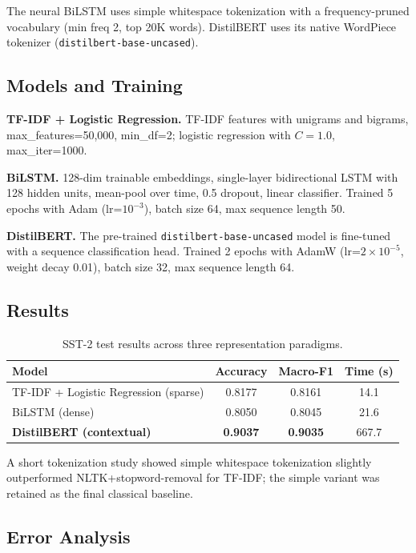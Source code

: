 \documentclass[11pt,a4paper]{article}
\begin{document}
The neural BiLSTM uses simple whitespace tokenization with a frequency-pruned vocabulary (min freq 2, top 20K words). DistilBERT uses its native WordPiece tokenizer (\texttt{distilbert-base-uncased}).

\subsection{Models and Training}

\textbf{TF-IDF + Logistic Regression.} TF-IDF features with unigrams and bigrams, max\_features=50{,}000, min\_df=2; logistic regression with $C=1.0$, max\_iter=1000.

\textbf{BiLSTM.} 128-dim trainable embeddings, single-layer bidirectional LSTM with 128 hidden units, mean-pool over time, 0.5 dropout, linear classifier. Trained 5 epochs with Adam (lr=$10^{-3}$), batch size 64, max sequence length 50.

\textbf{DistilBERT.} The pre-trained \texttt{distilbert-base-uncased} model is fine-tuned with a sequence classification head. Trained 2 epochs with AdamW (lr=$2\times10^{-5}$, weight decay 0.01), batch size 32, max sequence length 64.

\subsection{Results}

\begin{table}[h!]
\centering
\small
\caption{SST-2 test results across three representation paradigms.}
\begin{tabular}{lccc}
\toprule
\textbf{Model} & \textbf{Accuracy} & \textbf{Macro-F1} & \textbf{Time (s)}\\
\midrule
TF-IDF + Logistic Regression (sparse)        & 0.8177 & 0.8161 & 14.1\\
BiLSTM (dense)                                & 0.8050 & 0.8045 & 21.6\\
\textbf{DistilBERT (contextual)}             & \textbf{0.9037} & \textbf{0.9035} & 667.7\\
\bottomrule
\end{tabular}
\end{table}

A short tokenization study showed simple whitespace tokenization slightly outperformed NLTK+stopword-removal for TF-IDF; the simple variant was retained as the final classical baseline.

\subsection{Error Analysis}
\end{document}
